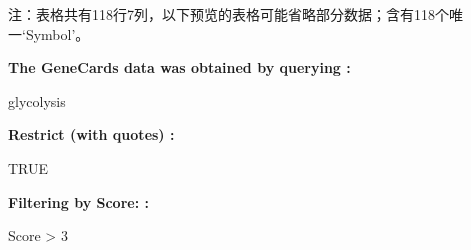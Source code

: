 \documentclass[
]{article}
\begin{document}
\begin{center}\begin{tcolorbox}[colback=gray!10, colframe=gray!50, width=0.9\linewidth, arc=1mm, boxrule=0.5pt]注：表格共有118行7列，以下预览的表格可能省略部分数据；含有118个唯一`Symbol'。
\end{tcolorbox}
\end{center}\begin{center}\begin{tcolorbox}[colback=gray!10, colframe=gray!50, width=0.9\linewidth, arc=1mm, boxrule=0.5pt]
\textbf{
The GeneCards data was obtained by querying
:}

\vspace{0.5em}

    glycolysis

\vspace{2em}


\textbf{
Restrict (with quotes)
:}

\vspace{0.5em}

    TRUE

\vspace{2em}


\textbf{
Filtering by Score:
:}

\vspace{0.5em}

    Score > 3

\vspace{2em}
\end{tcolorbox}
\end{center}
\end{document}
